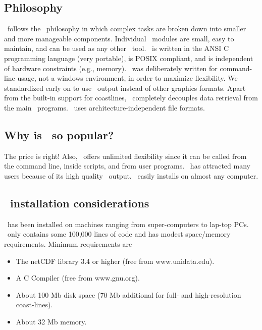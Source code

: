 \documentclass[11pt]{report}
\begin{document}
\subsection*{Philosophy}

\GMT\ follows the \UNIX\ philosophy in which complex tasks are broken
down into smaller and more manageable components.  Individual \GMT\
modules are small, easy to maintain, and can be used as any other
\UNIX\ tool.  \GMT\ is written in the ANSI C programming language
(very portable), is POSIX compliant, and is independent of
hardware constraints (e.g., memory).  \GMT\ was deliberately written
for command-line usage, not a windows environment, in order to
maximize flexibility.  We standardized early on to use \PS\ output
instead of other graphics formats.  Apart from the built-in support for
coastlines, \GMT\ completely decouples data retrieval from the main
\GMT\ programs.  \GMT\ uses architecture-independent file formats.

\subsection*{Why is \gmt\ so popular?}

The price is right!  Also, \GMT\ offers unlimited flexibility since
it can be called from the command line, inside scripts, and from user
programs.  \GMT\ has attracted many users because of its high quality
\PS\ output.  \GMT\ easily installs on almost any computer.

\subsection*{\gmt\ installation considerations}
\index{GMT@\GMT!installation}

\GMT\ has been installed on machines ranging from super-computers
to lap-top PCs.  \GMT\ only contains some 100,000 lines of code and
has modest space/memory requirements.  Minimum requirements are

\begin{itemize}

\item The netCDF library 3.4 or higher (free from www.unidata.edu).
\item A C Compiler (free from www.gnu.org).
\item About 100 Mb disk space (70 Mb additional for full- and
high-resolution coast-lines).
\item About 32 Mb memory.

\end{itemize}
\end{document}
